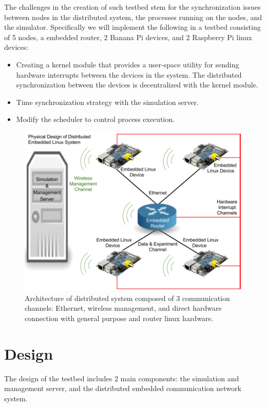 The challenges in the creation of such testbed stem for the synchronization issues between nodes in the distributed system, the processes running on the nodes, and the simulator. Specifically we will implement the following in a testbed consisting of 5 nodes, a embedded router, 2 Banana Pi devices, and 2 Raspberry Pi linux devices:

\begin{itemize}
\item Creating a kernel module that provides a user-space utility for sending hardware interrupts between the devices in the system.
The distributed synchronization between the devices is decentralized with the kernel module.
  \item Time synchronization strategy with the simulation server.
  \item Modify the scheduler to control process execution.
\end{itemize}

\begin{figure}
  \centering
  \includegraphics[scale=0.28]{Updated_architecture_emb-vt.png}
  \caption{
    Architecture of distributed system composed of 3 communication channels: Ethernet, wireless management, and direct hardware connection with general purpose and router linux hardware.
    }
\end{figure}


\section{Design}
The design of the testbed includes 2 main components: the simulation and management server, and the distributed embedded communication network system.

